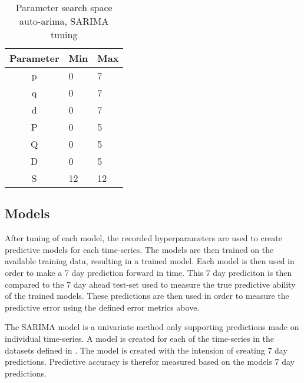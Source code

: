 \begin{table}[h]
  \centering
  \caption{Parameter search space auto-arima, SARIMA tuning}
  \label{table:method:arima-tuning}
  \begin{tabular}{|c|l|l|}\hline
    Parameter & Min & Max \\ \hline
    p         & 0   & 7   \\ \hline
    q         & 0   & 7   \\ \hline
    d         & 0   & 7   \\ \hline
    P         & 0   & 5   \\ \hline
    Q         & 0   & 5   \\ \hline
    D         & 0   & 5   \\ \hline
    S         & 12   & 12   \\ \hline
  \end{tabular}
\end{table}


\subsection{Models}

After tuning of each model, the recorded hyperparameters are used to create predictive models for each time-series.
The models are then trained on the available training data, resulting in a trained model.
Each model is then used in order to make a 7 day prediction forward in time.
This 7 day prediciton is then compared to the 7 day ahead test-set used to measure the true predictive ability of the trained models.
These predictions are then used in order to measure the predictive error using the defined error metrics above.



\fi



\iffalse
  The SARIMA model is a univariate method only supporting predictions made on individual time-series.
  A model is created for each of the time-series in the datasets defined in .
  The model is created with the intension of creating 7 day predictions.
  Predictive accuracy is therefor measured based on the models 7 day predictions.

